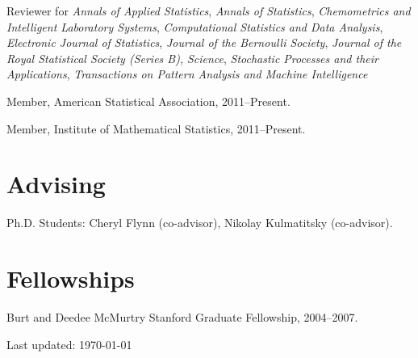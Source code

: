 \documentclass[10pt,letterpaper]{article}
\renewenvironment{itemize}{
  \begin{list}{}{
    \setlength{\leftmargin}{1.5em}
    \setlength{\itemsep}{0.25em}
    \setlength{\parskip}{0pt}
    \setlength{\parsep}{0.25em}
  }
}{
  \end{list}
}
\begin{document}
\begin{itemize}
\item Reviewer for
  \textit{Annals of Applied Statistics},
  \textit{Annals of Statistics},
  \textit{Chemometrics and Intelligent Laboratory Systems},
  \textit{Computational Statistics and Data Analysis},
  \textit{Electronic Journal of Statistics},
  \textit{Journal of the Bernoulli Society},
  \textit{Journal of the Royal Statistical Society (Series B),}
  \textit{Science},
  \textit{Stochastic Processes and their Applications},
  \textit{Transactions on Pattern Analysis and Machine Intelligence}
\item Member, American Statistical Association, 2011--Present.
\item Member, Institute of Mathematical Statistics, 2011--Present.
\end{itemize}

\section*{Advising}

\begin{itemize}
\item Ph.D. Students: Cheryl Flynn (co-advisor), Nikolay Kulmatitsky (co-advisor).
\end{itemize}

\section*{Fellowships}

\begin{itemize}
\item Burt and Deedee McMurtry Stanford Graduate Fellowship, 2004--2007.
\end{itemize}

\medskip

\begin{center}
  \begin{small}
    Last updated: \today
  \end{small}
\end{center}


\end{document}
